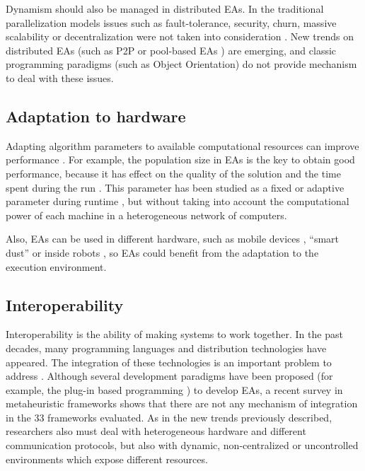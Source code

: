 Dynamism should also be managed in distributed EAs. In the traditional parallelization models \cite{alba2002parallelism} issues such as fault-tolerance, security, churn, massive scalability or decentralization were not taken into consideration \cite{Alba13parallel}. New trends on distributed EAs (such as P2P \cite{laredo2010evag} or pool-based EAs \cite{merelo2012pool}) are emerging,  and classic programming paradigms (such as Object Orientation) do not provide mechanism to deal with these issues.

\subsection{Adaptation to hardware}
Adapting algorithm parameters to available computational resources can improve performance \cite{AutomaticallyConfiguringStyles12}.  For example, the population size in EAs is the key to obtain good performance, because it has effect on the quality of the solution and the time spent during the run \cite{ShrinkageLaredo09}. This parameter has been studied as a fixed \cite{SizingHarik99} or adaptive parameter during runtime \cite{AdaptiveLobo07,SelfRegulatedSizeFernandes06}, but without taking into account the computational power of each machine in a heterogeneous network of computers. 

Also, EAs can be used in different hardware, such as mobile devices \cite{Garcia2009Mobile}, ``smart dust'' \cite{Rollings2008smartdust} or inside robots \cite{Garcia2012testing}, so EAs could benefit from the adaptation to the execution environment.


\subsection{Interoperability}
Interoperability is the ability of making systems to work together. In the past decades, many programming languages and distribution technologies have  appeared. The integration of these technologies is an important problem to address \cite{Papazoglou2007SOA}. Although several development paradigms have been proposed (for example, the plug-in based programming \cite{WagnerPlugins07}) to develop EAs, a recent survey in metaheuristic frameworks \cite{SURVEYMOFS} shows that there are not any mechanism of integration in the 33 frameworks evaluated. As in the new trends previously described, researchers also must deal  with heterogeneous hardware and different communication protocols, but also with dynamic, non-centralized or uncontrolled environments which expose different resources.

